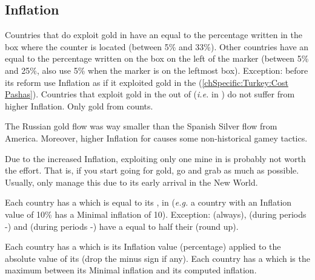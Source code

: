 \subsection{Inflation}
\bparag Countries that do exploit gold in \continentAmerica
have an  equal to the percentage written in the box
where the counter is located (between 5\% and 33\%).
\bparag Other countries have an  equal to the
percentage written on the box on the left of the marker (between 5\% and 25\%,
also use 5\% when the marker is on the leftmost box).
\bparag Exception: \TUR before its reform use Inflation as if it exploited
gold in the \ROTW (\ref{chSpecific:Turkey:Cost Pashas}).
\bparag Countries that exploit gold in the \ROTW out of \continentAmerica
(\emph{i.e.} \RUS in \continentSiberia) do not suffer from higher
Inflation. Only gold from \continentAmerica counts.

\begin{designnote}
  The Russian gold flow was way smaller than the Spanish Silver flow from
  America. Moreover, higher Inflation for \RUS causes some non-historical
  gamey tactics.
\end{designnote}

\begin{playtip}
  Due to the increased Inflation, exploiting only one mine in
  \continentAmerica is probably not worth the effort. That is, if you start
  going for gold, go and grab as much as possible. Usually, only \HIS manage
  this due to its early arrival in the New World.
\end{playtip}

\bparag Each country has a  which is equal to its
, in \ducats (\emph{e.g.} a country with an Inflation
value of 10\% has a Minimal inflation of 10\ducats).
\bparag Exception: \POL (always), \RUS (during periods -)
and \SUE (during periods -) %
have a  equal to half their 
(round up).

\bparag Each country has a  which is its Inflation
value (percentage) applied to the absolute value of its \RT (drop the minus
sign if any).
\bparag Each country has a  which is the maximum
between its Minimal inflation and its computed inflation.


